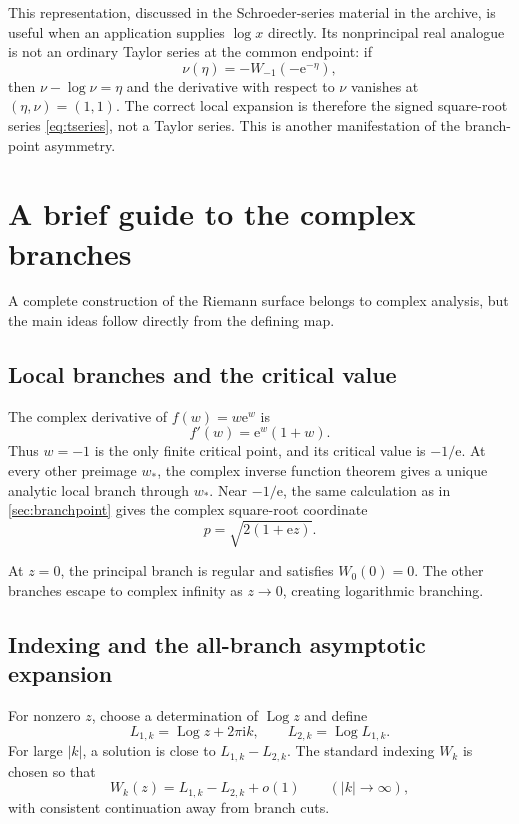 \documentclass[11pt]{article}
\theoremstyle{remark}
\newcommand{\ee}{\mathrm e}
\newcommand{\ii}{\mathrm i}
\newcommand{\Log}{\operatorname{Log}}
\newcommand{\littleo}{o}
\newcommand{\abs}[1]{\left|#1\right|}
\begin{document}
This representation, discussed in the Schroeder-series material in the
archive, is useful when an application supplies \(\log x\) directly.  Its
nonprincipal real analogue is not an ordinary Taylor series at the common
endpoint: if
\[
       \nu(\eta)=-W_{-1}(-\ee^{-\eta}),
\]
then \(\nu-\log\nu=\eta\) and the derivative with respect to \(\nu\)
vanishes at \((\eta,\nu)=(1,1)\).  The correct local expansion is therefore
the signed square-root series \eqref{eq:tseries}, not a Taylor series.  This
is another manifestation of the branch-point asymmetry.

\section{A brief guide to the complex branches}\label{sec:complex}

A complete construction of the Riemann surface belongs to complex analysis,
but the main ideas follow directly from the defining map.

\subsection{Local branches and the critical value}

The complex derivative of \(f(w)=w\ee^w\) is
\[
       f'(w)=\ee^w(1+w).
\]
Thus \(w=-1\) is the only finite critical point, and its critical value is
\(-1/\ee\).  At every other preimage \(w_*\), the complex inverse function
theorem gives a unique analytic local branch through \(w_*\).  Near
\(-1/\ee\), the same calculation as in \cref{sec:branchpoint} gives the
complex square-root coordinate
\[
       p=\sqrt{2(1+\ee z)}.
\]

At \(z=0\), the principal branch is regular and satisfies \(W_0(0)=0\).
The other branches escape to complex infinity as \(z\to0\), creating
logarithmic branching.

\subsection{Indexing and the all-branch asymptotic expansion}

For nonzero \(z\), choose a determination of \(\Log z\) and define
\[
       L_{1,k}=\Log z+2\pi\ii k,\qquad
       L_{2,k}=\Log L_{1,k}.
\]
For large \(\abs{k}\), a solution is close to
\(L_{1,k}-L_{2,k}\).  The standard indexing \(W_k\) is chosen so that
\begin{equation}\label{eq:complex-leading}
       W_k(z)=L_{1,k}-L_{2,k}+\littleo(1)
       \qquad(\abs{k}\to\infty),
\end{equation}
with consistent continuation away from branch cuts.
\end{document}
